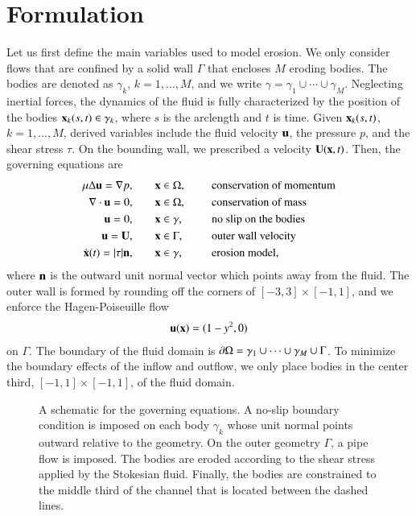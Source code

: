 \documentclass[preprint, 10pt]{elsarticle}
\begin{document}
\section{Formulation\label{s:formulation}} 
Let us first define the main variables used to model erosion.  We only
consider flows that are confined by a solid wall $\Gamma$ that encloses
$M$ eroding bodies.  The bodies are denoted as $\gamma_k$,
$k=1,\ldots,M$, and we write $\gamma = \gamma_1 \cup \cdots \cup
\gamma_M$.  Neglecting inertial forces, the dynamics of the fluid is
fully characterized by the position of the bodies ${\mathbf{x}}_k(s,t) \in
\gamma_k$, where $s$ is the arclength and $t$ is time.  Given
${\mathbf{x}}_k(s,t)$, $k=1,\ldots,M$, derived variables include the fluid
velocity ${\mathbf{u}}$, the pressure $p$, and the shear stress $\tau$.   On the
bounding wall, we prescribed a velocity ${\mathbf{U}}({\mathbf{x}},t)$.  Then, the
governing equations are
\begin{equation}
\label{eqn:erosionModel}
\begin{split}
  \mu \Delta {\mathbf{u}} = {\nabla} p, &\hspace{20pt} {\mathbf{x}} \in \Omega, \hspace*{.2in} &&\mbox{conservation
of momentum}\\
{\nabla} \cdot {\mathbf{u}} = 0, &\hspace{20pt} {\mathbf{x}} \in \Omega, \hspace*{.2in}
&&\mbox{conservation of mass} \\
{\mathbf{u}} = 0, &\hspace{20pt} {\mathbf{x}} \in \gamma, \hspace*{.2in} &&\mbox{no slip on the
bodies} \\
{\mathbf{u}} = {\mathbf{U}}, &\hspace{20pt} {\mathbf{x}} \in \Gamma, \hspace*{.2in} &&\mbox{outer wall
velocity} \\
\dot{{\mathbf{x}}}(t) = \lvert \tau \rvert {\mathbf{n}}, &\hspace{20pt} {\mathbf{x}} \in \gamma,
&&\mbox{erosion model},
\end{split}
\end{equation}
where ${\mathbf{n}}$ is the outward unit normal vector which points away from the
fluid.  The outer wall is formed by rounding off the corners of $[-3,3]
\times [-1,1]$, and we enforce the Hagen-Poiseuille flow
\begin{align*}
  {\mathbf{u}}({\mathbf{x}}) = (1-y^2,0)
\end{align*}
on $\Gamma$.  The boundary of the fluid domain is ${\partial}\Omega = \gamma_1
\cup \cdots \cup \gamma_M \cup \Gamma$.  To minimize the boundary
effects of the inflow and outflow, we only place bodies in the center
third, $[-1,1] \times [-1,1]$, of the fluid domain.
\begin{figure}[htpb]
  \centering
  
  \caption{\label{fig:schematic} A schematic for the governing
    equations.  A no-slip boundary condition is imposed on each body
    $\gamma_k$ whose unit normal points outward relative to the
    geometry.  On the outer geometry $\Gamma$, a pipe flow is imposed.
    The bodies are eroded according to the shear stress applied by the
    Stokesian fluid.  Finally, the bodies are constrained to the middle
    third of the channel that is located between the dashed lines.}
\end{figure}
\end{document}
